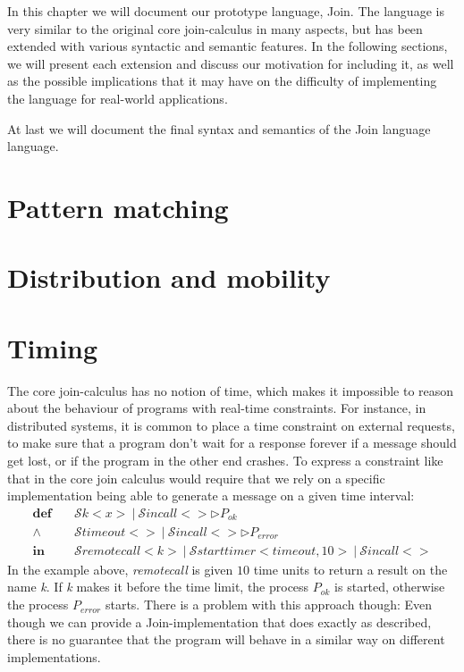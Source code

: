 \def\A{\mathcal{A}}
\def\C{\mathcal{C}}
\def\M{\mathcal{M}}
\def\D{\mathcal{D}}
\def\P{\mathcal{P}}
\def\S{\mathcal{S}}
\def\Q{\mathcal{Q}}
\def\Go#1{\text{go}\langle#1, k\rangle}
\def\Halt#1{\text{Halt}\langle\rangle}
\def\toJ#1{\stackrel{#1}{\triangleright}}
\def\inJ{~\mathbf{in}~}
\def\join#1in#2#3{#1\toJ{#2}#3}
\def\mscG#1#2{\vdash^{#1}_{#2}}
\def\mscJ{\mscG{t}{\phi}}
\def\time#1{\stackrel{t'}{\propto}}
\def\defJ{~\mathbf{def}~}
\def\match{~\mathbf{match}~}
\def\with{~\mathbf{with}~}
\def\linkUp#1{\stackrel{#1}{\diamond}}

In this chapter we will document our prototype language, Join.  The
language is very similar to the original core join-calculus in many
aspects, but has been extended with various syntactic and semantic
features. In the following sections, we will present each extension
and discuss our motivation for including it, as well as the possible
implications that it may have on the difficulty of implementing the
language for real-world applications.

At last we will document the final syntax and semantics of the Join
language language.


\section{Pattern matching}

\section{Distribution and mobility}

\section{Timing}

The core join-calculus has no notion of time, which makes it
impossible to reason about the behaviour of programs with real-time
constraints.  For instance, in distributed systems, it is common to
place a time constraint on external requests, to make sure that a
program don't wait for a response forever if a message should get
lost, or if the program in the other end crashes. To express a
constraint like that in the core join calculus would require that we
rely on a specific implementation being able to generate a message on
a given time interval:
\begin{align*}
  \textbf{def}\quad & \S k<x> ~|~ \S incall<> \triangleright P_{ok} \\
  \land\quad & \S timeout<> ~|~ \S incall<> \triangleright P_{error} \\
  \textbf{in}\quad & \S remotecall<k> ~|~ \S starttimer<timeout, 10>
                                      ~|~ \S incall<>
\end{align*}
In the example above, \emph{remotecall} is given $10$ time units to
return a result on the name \emph{k}. If \emph{k} makes it before the
time limit, the process $P_{ok}$ is started, otherwise the process
$P_{error}$ starts.  There is a problem with this approach though:
Even though we can provide a Join-implementation that does exactly as
described, there is no guarantee that the program will behave in a
similar way on different implementations.

